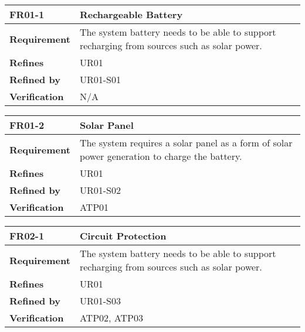 \documentclass[class=report,11pt,crop=false]{standalone}
\begin{document}
\begin{table}
\centering

\begin{tabular}{|>{\raggedright\arraybackslash}p{0.2\linewidth}|>{\raggedright\arraybackslash}p{0.8\linewidth}|}
\hline
\textbf{FR01-1} & \textbf{Rechargeable Battery} \\
\hline
\textbf{Requirement} & The system battery needs to be able to support recharging from sources such as solar power. \\
\hline
\textbf{Refines} & UR01 \\
\hline
\textbf{Refined by} & UR01-S01 \\
\hline
\textbf{Verification} & N/A \\
\hline

\end{tabular}

\end{table}

 

\begin{table}
\centering

\begin{tabular}{|>{\raggedright\arraybackslash}p{0.2\linewidth}|>{\raggedright\arraybackslash}p{0.8\linewidth}|}
\hline
\textbf{FR01-2} & \textbf{Solar Panel} \\
\hline
\textbf{Requirement} & The system requires a solar panel as a form of solar power generation to charge the battery. \\
\hline
\textbf{Refines} & UR01 \\
\hline
\textbf{Refined by} & UR01-S02 \\
\hline
\textbf{Verification} & ATP01 \\
\hline

\end{tabular}

\end{table}

 

\begin{table}
\centering

\begin{tabular}{|>{\raggedright\arraybackslash}p{0.2\linewidth}|>{\raggedright\arraybackslash}p{0.8\linewidth}|}
\hline
\textbf{FR02-1} & \textbf{Circuit Protection} \\
\hline
\textbf{Requirement} & The system battery needs to be able to support recharging from sources such as solar power. \\
\hline
\textbf{Refines} & UR01 \\
\hline
\textbf{Refined by} & UR01-S03 \\
\hline
\textbf{Verification} & ATP02, ATP03 \\
\hline

\end{tabular}

\end{table}
\end{document}
